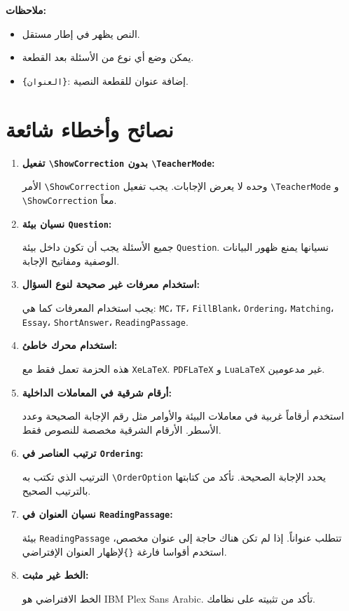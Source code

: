 \documentclass[a4paper]{article}
\newcommand{\engsf}[1]{\textenglish{\textsf{#1}}}
\begin{document}
\textbf{ملاحظات:}
\begin{itemize}
    \item النص يظهر في إطار مستقل.
    \item يمكن وضع أي نوع من الأسئلة بعد القطعة.
    \item \texttt{\{العنوان\}}: إضافة عنوان للقطعة النصية.    
\end{itemize}

\section{نصائح وأخطاء شائعة}
\begin{enumerate}
    \item \textbf{تفعيل \texttt{\textbackslash ShowCorrection} بدون \texttt{\textbackslash TeacherMode}:}\par
    الأمر \texttt{\textbackslash ShowCorrection} وحده لا يعرض الإجابات. يجب تفعيل \texttt{\textbackslash TeacherMode} و \texttt{\textbackslash ShowCorrection} معاً.
    
    \item \textbf{نسيان بيئة \texttt{Question}:}\par
    جميع الأسئلة يجب أن تكون داخل بيئة \texttt{Question}. نسيانها يمنع ظهور البيانات الوصفية ومفاتيح الإجابة.
    
    \item \textbf{استخدام معرفات غير صحيحة لنوع السؤال:}\par
    يجب استخدام المعرفات كما هي: \texttt{MC}، \texttt{TF}، \texttt{FillBlank}، \texttt{Ordering}، \texttt{Matching}، \texttt{Essay}، \texttt{ShortAnswer}، \texttt{ReadingPassage}.
    
    \item \textbf{استخدام محرك خاطئ:}\par
    هذه الحزمة تعمل فقط مع \texttt{XeLaTeX}. \texttt{PDFLaTeX} و \texttt{LuaLaTeX} غير مدعومين.
    
    \item \textbf{أرقام شرقية في المعاملات الداخلية:}\par
    استخدم أرقاماً غربية في معاملات البيئة والأوامر مثل رقم الإجابة الصحيحة وعدد الأسطر. الأرقام الشرقية مخصصة للنصوص فقط.
    
    \item \textbf{ترتيب العناصر في \texttt{Ordering}:}\par
    الترتيب الذي تكتب به \texttt{\textbackslash OrderOption} يحدد الإجابة الصحيحة. تأكد من كتابتها بالترتيب الصحيح.
    
    \item \textbf{نسيان العنوان في \texttt{ReadingPassage}:}\par
    بيئة \texttt{ReadingPassage} تتطلب عنواناً. إذا لم تكن هناك حاجة إلى عنوان مخصص، استخدم أقواسا فارغة \texttt{\{\}}لإظهار العنوان الإفتراضي.
    
    \item \textbf{الخط غير مثبت:}\par
    الخط الافتراضي هو \engsf{IBM Plex Sans Arabic}. تأكد من تثبيته على نظامك.
\end{enumerate}
\end{document}
